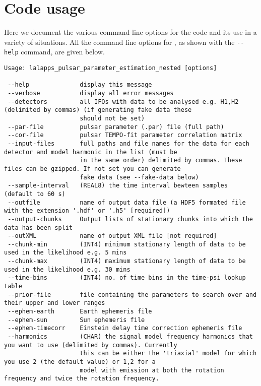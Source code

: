 \appendix

\section{Code usage}

Here we document the various command line options for the code and its use in a variety of situations. All the command
line options for \lppen, as shown with the \verb|--help| command, are given below.

\begin{footnotesize}
\begin{verbatim}
Usage: lalapps_pulsar_parameter_estimation_nested [options]

 --help              display this message
 --verbose           display all error messages
 --detectors         all IFOs with data to be analysed e.g. H1,H2 (delimited by commas) (if generating fake data these
                     should not be set)
 --par-file          pulsar parameter (.par) file (full path)
 --cor-file          pulsar TEMPO-fit parameter correlation matrix
 --input-files       full paths and file names for the data for each detector and model harmonic in the list (must be
                     in the same order) delimited by commas. These files can be gzipped. If not set you can generate
                     fake data (see --fake-data below)
 --sample-interval   (REAL8) the time interval bewteen samples (default to 60 s)
 --outfile           name of output data file (a HDF5 formated file with the extension '.hdf' or '.h5' [required])
 --output-chunks     Output lists of stationary chunks into which the data has been split
 --outXML            name of output XML file [not required]
 --chunk-min         (INT4) minimum stationary length of data to be used in the likelihood e.g. 5 mins
 --chunk-max         (INT4) maximum stationary length of data to be used in the likelihood e.g. 30 mins
 --time-bins         (INT4) no. of time bins in the time-psi lookup table
 --prior-file        file containing the parameters to search over and their upper and lower ranges
 --ephem-earth       Earth ephemeris file
 --ephem-sun         Sun ephemeris file
 --ephem-timecorr    Einstein delay time correction ephemeris file
 --harmonics         (CHAR) the signal model frequency harmonics that you want to use (delimited by commas). Currently
                     this can be either the 'triaxial' model for which you use 2 (the default value) or 1,2 for a
                     model with emission at both the rotation frequency and twice the rotation frequency.

\end{verbatim}
\end{footnotesize}
